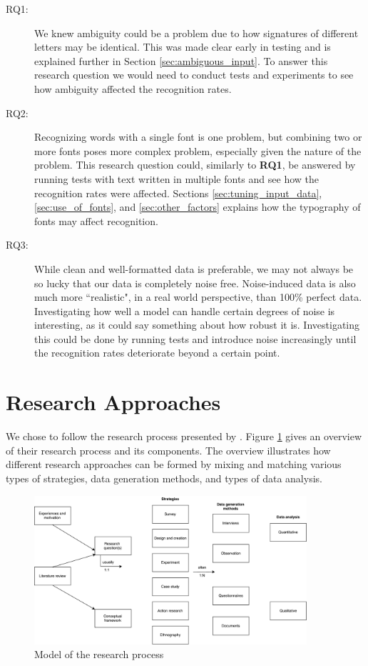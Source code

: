 \begin{description}
    \item[RQ1:]{We knew ambiguity could be a problem due to how signatures of different letters may be identical. This was made clear early in testing and is explained further in Section \ref{sec:ambiguous_input}. To answer this research question we would need to conduct tests and experiments to see how ambiguity affected the recognition rates.}
    \item[RQ2:]{Recognizing words with a single font is one problem, but combining two or more fonts poses more complex problem, especially given the nature of the problem. This research question could, similarly to \textbf{RQ1}, be answered by running tests with text written in multiple fonts and see how the recognition rates were affected. Sections \ref{sec:tuning_input_data}, \ref{sec:use_of_fonts}, and \ref{sec:other_factors} explains how the typography of fonts may affect recognition.}
    \item[RQ3:]{While clean and well-formatted data is preferable, we may not always be so lucky that our data is completely noise free. Noise-induced data is also much more ``realistic", in a real world perspective, than 100\% perfect data. Investigating how well a model can handle certain degrees of noise is interesting, as it could say something about how robust it is. Investigating this could be done by running tests and introduce noise increasingly until the recognition rates deteriorate beyond a certain point.}
\end{description}


\section{Research Approaches}
\label{sec:research_approaches}
We chose to follow the research process presented by \citep{oates2005researching}. Figure \ref{fig:model_research_process} gives an overview of their research process and its components. The overview illustrates how different research approaches can be formed by mixing and matching various types of strategies, data generation methods, and types of data analysis.

\begin{figure}[ht]
    \centering
    \includegraphics[width=0.9\textwidth]{fig/methodology/research_strategies.pdf}
    \caption{Model of the research process}
    \label{fig:model_research_process}
\end{figure}

